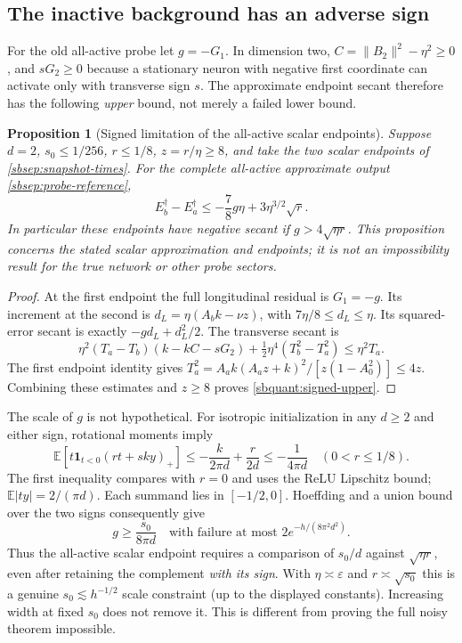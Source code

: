 \documentclass{article} %
\theoremstyle{plain}
\newtheorem{proposition}[theorem]{Proposition}
\theoremstyle{definition}
\theoremstyle{remark}
\begin{document}
\subsection{The inactive background has an adverse sign}

For the old all-active probe let $g=-G_1$. In dimension two,
$C=\|B_2\|^2-\eta^2\ge0$, and $sG_2\ge0$ because a stationary neuron
with negative first coordinate can activate only with transverse sign $s$.
The approximate endpoint secant therefore has the following \emph{upper}
bound, not merely a failed lower bound.

\begin{proposition}[Signed limitation of the all-active scalar endpoints]
\label{sbquant:signed-obstruction}
Suppose $d=2$, $s_0\le1/256$, $r\le1/8$, $z=r/\eta\ge8$, and take
the two scalar endpoints of \eqref{sbsep:snapshot-times}. For the complete
all-active approximate output \eqref{sbsep:probe-reference},
\begin{equation}\label{sbquant:signed-upper}
 E_b^\dagger-E_a^\dagger
 \le-\frac78g\eta+3\eta^{3/2}\sqrt r.
\end{equation}
In particular these endpoints have \emph{negative} secant if
$g>4\sqrt{\eta r}$. This proposition concerns the stated scalar
approximation and endpoints; it is not an impossibility result for the
true network or other probe sectors.
\end{proposition}
\begin{proof}
At the first endpoint the full longitudinal residual is $G_1=-g$.
Its increment at the second is
$d_L=\eta(A_bk-\nu z)$, with $7\eta/8\le d_L\le\eta$.
Its squared-error secant is exactly $-gd_L+d_L^2/2$.
The transverse secant is
\[
 \eta^2(T_a-T_b)(k-kC-sG_2)
 +\tfrac12\eta^4(T_b^2-T_a^2)
 \le\eta^2T_a.
\]
The first endpoint identity gives
$T_a^2=A_ak(A_az+k)^2/[z(1-A_0^2)]\le4z$.
Combining these estimates and $z\ge8$ proves
\eqref{sbquant:signed-upper}.
\end{proof}

The scale of $g$ is not hypothetical. For isotropic initialization in any
$d\ge2$ and either sign, rotational moments imply
\[
 \mathbb E[t\mathbf1_{t<0}(rt+sky)_+]
 \le-\frac{k}{2\pi d}+\frac r{2d}
 \le-\frac1{4\pi d}\quad(0<r\le1/8).
\]
The first inequality compares with $r=0$ and uses the ReLU Lipschitz
bound; $\mathbb E|ty|=2/(\pi d)$. Each summand lies in $[-1/2,0]$.
Hoeffding and a union bound over the two signs consequently give
\begin{equation}\label{sbquant:background-size}
 g\ge\frac{s_0}{8\pi d}
 \quad\text{with failure at most }2e^{-h/(8\pi^2d^2)}.
\end{equation}
Thus the all-active scalar endpoint requires a comparison of
$s_0/d$ against $\sqrt{\eta r}$, even after retaining the complement
\emph{with its sign}. With $\eta\asymp\varepsilon$ and
$r\asymp\sqrt{s_0}$ this is a genuine $s_0\lesssim h^{-1/2}$ scale
constraint (up to the displayed constants). Increasing width at fixed
$s_0$ does not remove it. This is different from proving the full noisy
theorem impossible.
\end{document}
